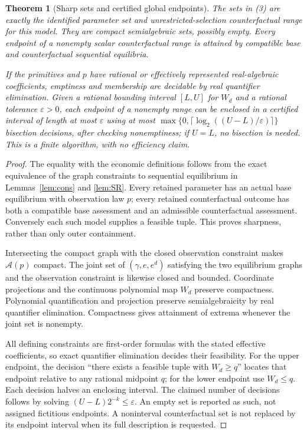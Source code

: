 \documentclass[11pt]{article}
\newtheorem{theorem}{Theorem}
\theoremstyle{remark}\newtheorem{remark}[theorem]{Remark}
\begin{document}
\begin{theorem}[Sharp sets and certified global endpoints]\label{thm:identified}
The sets in (3) are exactly the identified parameter set and unrestricted-selection counterfactual range for this model. They are compact semialgebraic sets, possibly empty. Every endpoint of a nonempty scalar counterfactual range is attained by compatible base and counterfactual sequential equilibria.

If the primitives and $p$ have rational or effectively represented real-algebraic coefficients, emptiness and membership are decidable by real quantifier elimination. Given a rational bounding interval $[L,U]$ for $W_d$ and a rational tolerance $\varepsilon>0$, each endpoint of a nonempty range can be enclosed in a certified interval of length at most $\varepsilon$ using at most
$\max\{0,\lceil\log_2((U-L)/\varepsilon)\rceil\}$ bisection decisions, after checking nonemptiness; if $U=L$, no bisection is needed. This is a finite algorithm, with no efficiency claim.
\end{theorem}
\begin{proof}
The equality with the economic definitions follows from the exact equivalence of the graph constraints to sequential equilibrium in Lemmas~\ref{lem:cons} and \ref{lem:SR}. Every retained parameter has an actual base equilibrium with observation law $p$; every retained counterfactual outcome has both a compatible base assessment and an admissible counterfactual assessment. Conversely each such model supplies a feasible tuple. This proves sharpness, rather than only outer containment.

Intersecting the compact graph with the closed observation constraint makes $\mathcal A(p)$ compact. The joint set of $(\gamma,e,e^d)$ satisfying the two equilibrium graphs and the observation constraint is likewise closed and bounded. Coordinate projections and the continuous polynomial map $W_d$ preserve compactness. Polynomial quantification and projection preserve semialgebraicity by real quantifier elimination. Compactness gives attainment of extrema whenever the joint set is nonempty.

All defining constraints are first-order formulas with the stated effective coefficients, so exact quantifier elimination decides their feasibility. For the upper endpoint, the decision ``there exists a feasible tuple with $W_d\geq q$'' locates that endpoint relative to any rational midpoint $q$; for the lower endpoint use $W_d\leq q$. Each decision halves an enclosing interval. The claimed number of decisions follows by solving $(U-L)2^{-k}\leq\varepsilon$. An empty set is reported as such, not assigned fictitious endpoints. A noninterval counterfactual set is not replaced by its endpoint interval when its full description is requested.
\end{proof}
\end{document}
